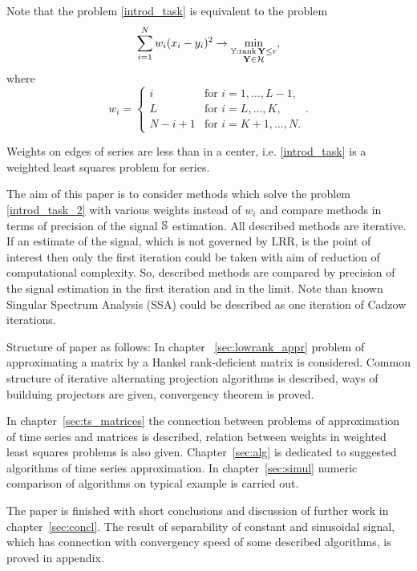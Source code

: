 \documentclass[12pt,a4paper,fleqn,leqno]{article}
\def\rank{\mathop{\mathrm{rank}}}
\begin{document}
Note that the problem \eqref{introd_task} is equivalent to the problem
\begin{equation}\label{introd_task_2}
\sum_{i = 1}^N w_i(x_i - y_i)^2 \to \min_{\substack{\tsY: \rank \bfY \le r \\ \bfY \in \calH}},
\end{equation}
where
\begin{equation}
\label{eq:w}
w_i = \begin{cases}
i & \text{for $i = 1, \ldots, L-1,$}\\
L & \text{for $i = L, \ldots, K,$}\\
N - i + 1 & \text{for $i = K + 1, \ldots, N.$}
\end{cases}.
\end{equation}

Weights on edges of series are less than in a center, i.e. \eqref{introd_task} is a weighted least squares problem for series.

The aim of this paper is to consider methods which solve the problem \eqref{introd_task_2} with various weights instead of $w_i$ and compare methods in terms of precision of the signal $\mathbb{S}$ estimation. All described methods are iterative. If an estimate of the signal, which is not governed by LRR, is the point of interest then only the first iteration could be taken with aim of reduction of computational complexity. So, described methods are compared by precision of the signal estimation in the first iteration and in the limit. Note than known Singular Spectrum Analysis (SSA) \cite{Broomhead.King1986, Vautard.etal1992, Elsner.Tsonis1996, Golyandina.etal2001, Ghil.etal2002, Golyandina.Zhigljavsky2012} could be
described as one iteration of Cadzow iterations.

Structure of paper as follows:  In chapter ~\ref{sec:lowrank_appr} problem of approximating a matrix by a Hankel rank-deficient matrix is considered. Common structure of iterative alternating projection algorithms is described, ways of builduing projectors are given, convergency theorem is proved.

In chapter~\ref{sec:ts_matrices} the connection between problems of approximation of time series and matrices is described, relation between weights in weighted least squares problems is also given. Chapter~\ref{sec:alg} is dedicated to suggested algorithms of time series approximation. In chapter~\ref{sec:simul} numeric comparison of algorithms on typical example is carried out.

The paper is finished with short conclusions and discussion of further work in chapter~\ref{sec:concl}. The result of separability of constant and sinusoidal signal, which has connection with convergency speed of some described algorithms, is proved in appendix.
\end{document}
